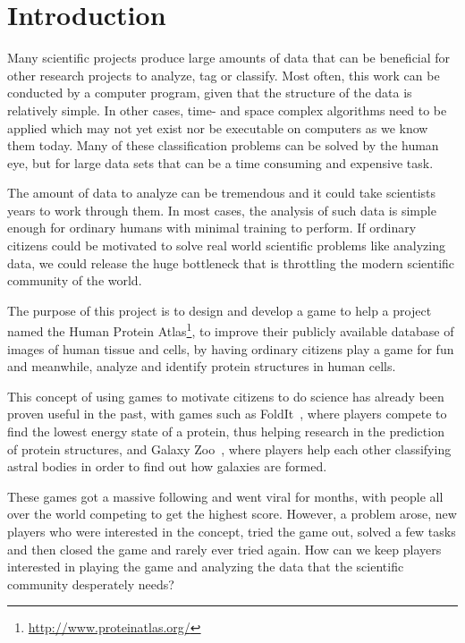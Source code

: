 \section{Introduction}\label{sec:introduction}

Many scientific projects produce large amounts of data that can be beneficial for other research projects to analyze, tag or classify. Most often, this work can be conducted by a computer program, given that the structure of the data is relatively simple. In other cases, time- and space complex algorithms need to be applied which may not yet exist nor be executable on computers as we know them today. Many of these classification problems can be solved by the human eye, but for large data sets that can be a time consuming and expensive task.

The amount of data to analyze can be tremendous and it could take scientists years to work through them. In most cases, the analysis of such data is simple enough for ordinary humans with minimal training to perform. If ordinary citizens could be motivated to solve real world scientific problems like analyzing data, we could release the huge bottleneck that is throttling the modern scientific community of the world.


% 
The purpose of this project is to design and develop a game to help a project named the Human Protein Atlas\footnote{\url{http://www.proteinatlas.org/}}, to improve their publicly available database of images of human tissue and cells, by having ordinary citizens play a game for fun and meanwhile, analyze and identify protein structures in human cells.

This concept of using games to motivate citizens to do science has already been proven useful in the past, with games such as FoldIt~\cite{foldit}, where players compete to find the lowest energy state of a protein, thus helping research in the prediction of protein structures, and Galaxy Zoo~\cite{galaxyzoo}, where players help each other classifying astral bodies in order to find out how galaxies are formed.

These games got a massive following and went viral for months, with people all over the world competing to get the highest score. However, a problem arose, new players who were interested in the concept, tried the game out, solved a few tasks and then closed the game and rarely ever tried again. How can we keep players interested in playing the game and analyzing the data that the scientific community desperately needs?

